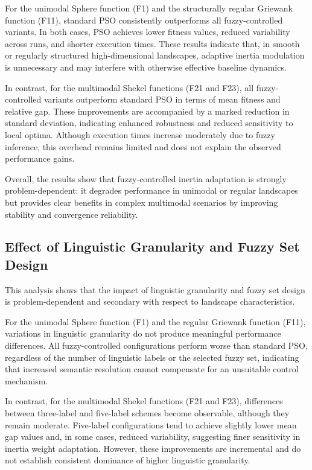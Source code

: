\documentclass[runningheads]{llncs}
\begin{document}
\vspace{-1.0cm}


For the unimodal Sphere function (F1) and the structurally regular Griewank function (F11), standard PSO consistently outperforms all fuzzy-controlled variants. In both cases, PSO achieves lower fitness values, reduced variability across runs, and shorter execution times. These results indicate that, in smooth or regularly structured high-dimensional landscapes, adaptive inertia modulation is unnecessary and may interfere with otherwise effective baseline dynamics.

In contrast, for the multimodal Shekel functions (F21 and F23), all fuzzy-controlled variants outperform standard PSO in terms of mean fitness and relative gap. These improvements are accompanied by a marked reduction in standard deviation, indicating enhanced robustness and reduced sensitivity to local optima. Although execution times increase moderately due to fuzzy inference, this overhead remains limited and does not explain the observed performance gains.

Overall, the results show that fuzzy-controlled inertia adaptation is strongly problem-dependent: it degrades performance in unimodal or regular landscapes but provides clear benefits in complex multimodal scenarios by improving stability and convergence reliability.


\vspace{-0.25cm}
\subsection{Effect of Linguistic Granularity and Fuzzy Set Design}
\label{subsec:granularity}

This analysis shows that the impact of linguistic granularity and fuzzy set design is problem-dependent and secondary with respect to landscape characteristics.

For the unimodal Sphere function (F1) and the regular Griewank function (F11), variations in linguistic granularity do not produce meaningful performance differences. All fuzzy-controlled configurations perform worse than standard PSO, regardless of the number of linguistic labels or the selected fuzzy set, indicating that increased semantic resolution cannot compensate for an unsuitable control mechanism.

In contrast, for the multimodal Shekel functions (F21 and F23), differences between three-label and five-label schemes become observable, although they remain moderate. Five-label configurations tend to achieve slightly lower mean gap values and, in some cases, reduced variability, suggesting finer sensitivity in inertia weight adaptation. However, these improvements are incremental and do not establish consistent dominance of higher linguistic granularity.
\end{document}
